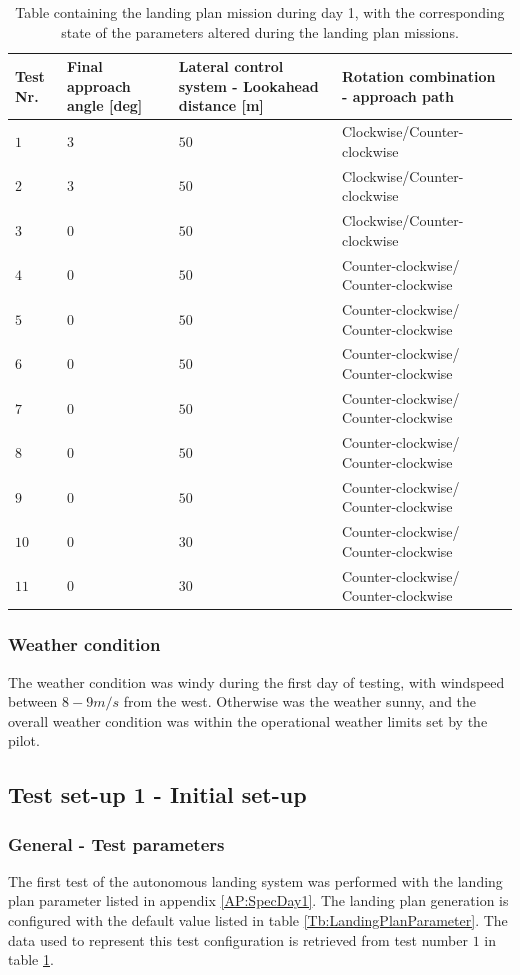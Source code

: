 \begin{table}[H]
\begin{tabular}{| p{0.5cm} | p{3cm} | p{4cm} | p{4cm} |}
\hline
\textbf{Test Nr.} & \textbf{Final approach angle [deg]} & \textbf{Lateral control system - Lookahead distance [m]} &  \textbf{Rotation combination - approach path}\\ \hline
$1$				& $3$ &	$ 50 $ 	& Clockwise/Counter-clockwise		\\ \hline
$2$				& $3$ & $ 50 $	& Clockwise/Counter-clockwise			\\ \hline
$3$				& $0$ & $ 50 $	& Clockwise/Counter-clockwise		\\ \hline
$4$				& $0$ & $ 50 $ 	& Counter-clockwise/ Counter-clockwise				\\ \hline
$5$				& $0$ & $ 50 $ & Counter-clockwise/ Counter-clockwise					\\ \hline
$6$				& $0$ & $ 50 $	& Counter-clockwise/ Counter-clockwise				\\ \hline
$7$				& $0$ &	$ 50 $ & Counter-clockwise/ Counter-clockwise				\\ \hline
$8$				& $0$ & $ 50 $	& Counter-clockwise/ Counter-clockwise				\\ \hline
$9$				& $0$ & $ 50 $ & Counter-clockwise/ Counter-clockwise			\\ \hline
$10$			& $0$ &	$ 30 $ & Counter-clockwise/ Counter-clockwise	\\ \hline
$11$			& $0$ & $ 30 $ & Counter-clockwise/ Counter-clockwise\\ \hline
\end{tabular}
\caption{Table containing the landing plan mission during day 1, with the corresponding state of the parameters altered during the landing plan missions.}
\label{tb:Day1ParameterAlteration}
\end{table}
\subsubsection{Weather condition}
The weather condition was windy during the first day of testing, with windspeed between $8-9 m/s$ from the west. Otherwise was the weather sunny, and the overall weather condition was within the operational weather limits set by the pilot.
\subsection{Test set-up 1 - Initial set-up}
\subsubsection{General - Test parameters}\label{ss:TestParaInitiDay1}
The first test of the autonomous landing system was performed with the landing plan parameter listed in appendix \ref{AP:SpecDay1}. The landing plan generation is configured with the default value listed in table \ref{Tb:LandingPlanParameter}. The data used to represent this test configuration is retrieved from test number $1$ in table \ref{tb:Day1ParameterAlteration}.
